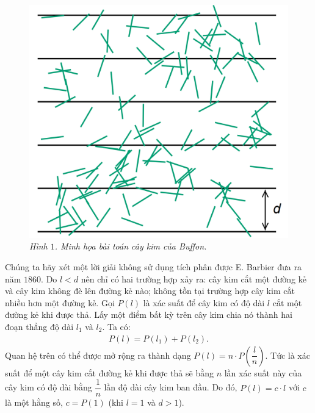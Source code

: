 \begin{multicols}{2}
\begin{figure}[H]
		\centering
		\captionsetup{labelformat= empty, justification=centering}
		\includegraphics[width=1\linewidth]{2}
		\caption{\small\textit{\color{toanhocdoisong}Hình $1$. Minh họa bài toán cây kim của Buffon.}}
		\vspace*{-10pt}
	\end{figure}
	Chúng ta hãy xét một lời giải không sử dụng tích phân được E. Barbier đưa ra năm $1860$.
	\vskip 0.1cm 
	Do $l<d$ nên chỉ có hai trường hợp xảy ra: cây kim cắt một đường kẻ và cây kim không đè lên đường kẻ nào; không tồn tại trường hợp cây kim cắt nhiều hơn một đường kẻ.
	\vskip 0.1cm
	Gọi $P(l)$ là xác suất để cây kim có độ dài $l$ cắt một đường kẻ khi được thả. Lấy một điểm bất kỳ trên cây kim chia nó thành hai đoạn thẳng độ dài $l_1$ và $l_2$. Ta có:
	\begin{align*}
		P(l)=P(l_1 )+P(l_2).
	\end{align*}
	Quan hệ trên có thể được mở rộng ra thành dạng $P(l)=n\cdot P(\dfrac{l}{n})$. Tức là xác suất để một cây kim cắt đường kẻ khi được thả sẽ bằng $n$ lần xác suất này của cây kim có độ dài bằng $\dfrac{1}{n}$ lần độ dài cây kim ban đầu.
	\vskip 0.1cm
	Do đó, $P(l)=c\cdot l$ với $c$ là một hằng số, $c=P(1)$ (khi $l=1$ và $d > 1$).
	\begin{figure}[H]
		\vspace*{-5pt}
		\centering
		\captionsetup{labelformat= empty, justification=centering}
		\begin{tikzpicture}[scale=0.58]

\end{tikzpicture}
\end{figure}
\end{multicols}
